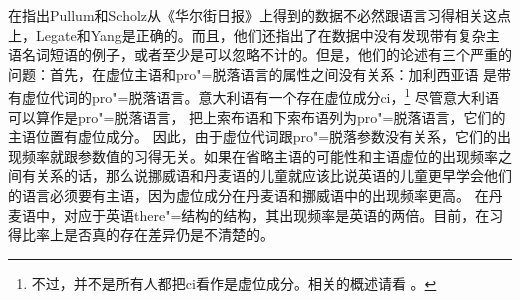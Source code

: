 在指出Pullum和Scholz从《华尔街日报》上得到的数据不必然跟语言习得相关这点上，Legate和Yang是正确的。而且，他们还指出了在数据中没有发现带有复杂主语名词短语的例子，或者至少是可以忽略不计的。但是，他们的论述有三个严重的问题：首先，在虚位主语和pro"=脱落语言的属性之间没有关系：加利西亚语 \citep[\S~2.5]{RU90a-u}是带有虚位代词的pro"=脱落语言。意大利语有一个存在虚位成分ci，\footnote{%
不过，并不是所有人都把ci看作是虚位成分。相关的概述请看 。
} 尽管意大利语可以算作是pro"=脱落语言， \citet{Franks95a-u}把上索布语和下索布语列为pro"=脱落语言，它们的主语位置有虚位成分。
因此，由于虚位代词跟pro"=脱落参数没有关系，它们的出现频率就跟参数值的习得无关。如果在省略主语的可能性和主语虚位的出现频率之间有关系的话，那么说挪威语和丹麦语的儿童就应该比说英语的儿童更早学会他们的语言必须要有主语，因为虚位成分在丹麦语和挪威语中的出现频率更高\citep[]{SP2002b}。
在丹麦语中，对应于英语there"=结构的结构，其出现频率是英语的两倍。目前，在习得比率上是否真的存在差异仍是不清楚的\citep[]{Pullum2009a}。

